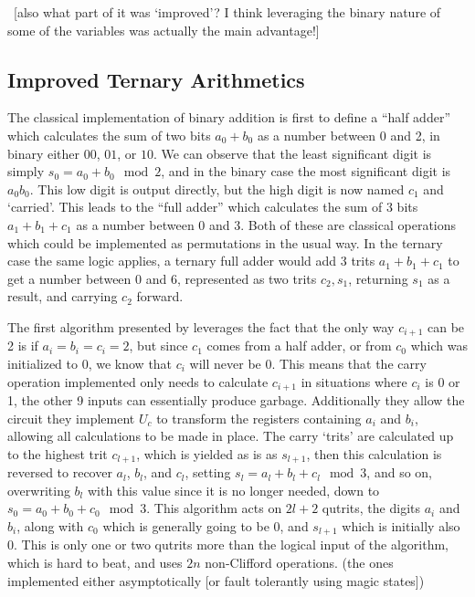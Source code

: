 \ [also what part of it was `improved'? I think leveraging the binary nature of some of the variables was actually the main advantage!]
\subsection{Improved Ternary Arithmetics}
The classical implementation of binary addition is first to define a ``half adder'' which calculates the sum of two bits $a_0 + b_0$ as a number between 0 and 2, in binary either $00$, $01$, or $10$. We can observe that the least significant digit is simply $s_0 = a_0 + b_0 \mod 2$, and in the binary case the most significant digit is $a_0b_0$. This low digit is output directly, but the high digit is now named $c_1$ and `carried'. This leads to the ``full adder'' which calculates the sum of 3 bits $a_1 + b_1 + c_1$ as a number between 0 and 3. Both of these are classical operations which could be implemented as permutations in the usual way. In the ternary case the same logic applies, a ternary full adder would add 3 trits $a_1 + b_1 + c_1$ to get a number between 0 and 6, represented as two trits $c_2, s_1$, returning $s_1$ as a result, and carrying $c_2$ forward.

The first algorithm presented by \cite{arithmetics} leverages the fact that the only way $c_{i+1}$ can be 2 is if $a_i = b_i = c_i = 2$, but since $c_1$ comes from a half adder, or from $c_0$ which was initialized to 0, we know that $c_i$ will never be 0. This means that the carry operation implemented only needs to calculate $c_{i+1}$ in situations where $c_i$ is 0 or 1, the other 9 inputs can essentially produce garbage. Additionally they allow the circuit they implement $U_c$ to transform the registers containing $a_i$ and $b_i$, allowing all calculations to be made in place. The carry `trits' are calculated up to the highest trit $c_{l+1}$, which is yielded as is as $s_{l+1}$, then this calculation is reversed to recover $a_l$, $b_l$, and $c_l$, setting $s_l = a_l + b_l + c_l \mod 3$, and so on, overwriting $b_l$ with this value since it is no longer needed, down to $s_0 = a_0 + b_0 + c_0 \mod 3$. This algorithm acts on $2l+2$ qutrits, the digits $a_i$ and $b_i$, along with $c_0$ which is generally going to be 0, and $s_{l+1}$ which is initially also 0. This is only one or two qutrits more than the logical input of the algorithm, which is hard to beat, and uses $2n$ non-Clifford operations. (the ones implemented either asymptotically [or fault tolerantly using magic states])


